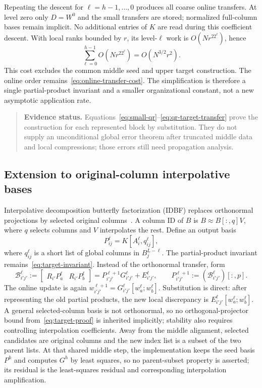 \documentclass[11pt,a4paper]{article}
\newenvironment{evidence}{\begin{quote}\small\color{muted}\textbf{Evidence status.} }{\end{quote}}
\begin{document}
Repeating the descent for $\ell=h-1,\ldots,0$ produces all coarse online transfers. At level zero only $D=W^0$ and the small transfers are stored; normalized full-column bases remain implicit. No additional entries of $K$ are read during this coefficient descent. With local ranks bounded by $r$, its level-$\ell$ work is $O(Nr^22^\ell)$, hence
\begin{equation}
 \sum_{\ell=0}^{h-1}O(Nr^22^\ell)=O(N^{3/2}r^2).
 \label{eq:qr-descent-cost}
\end{equation}
This cost excludes the common middle seed and upper target construction. The online order remains~\eqref{eq:online-transfer-cost}. The simplification is therefore a single partial-product invariant and a smaller organizational constant, not a new asymptotic application rate.
\begin{evidence}
Equations~\eqref{eq:small-qr}--\eqref{eq:qr-target-transfer} prove the construction for each represented block by substitution. They do not supply an unconditional global error theorem after truncated middle data and local compressions; those errors still need propagation analysis.
\end{evidence}

\subsection{Extension to original-column interpolative bases}
\label{sec:idbf-target}
Interpolative decomposition butterfly factorization (IDBF) replaces orthonormal projections by selected original columns~\cite{pang2018idbf}. A column ID of $B$ is $B\approx B[:,q]V$, where $q$ selects columns and $V$ interpolates the rest. Define an output basis
\begin{equation}
 P_{ij}^{\ell}=K[A_i^\ell,q_{ij}^{\ell}],
 \label{eq:id-original-basis}
\end{equation}
where $q_{ij}^{\ell}$ is a short list of global columns in $B_j^{L-\ell}$. The partial-product invariant remains~\eqref{eq:target-invariant}. Instead of the orthonormal transfer, form
\begin{equation}
 \mathcal B_{i'j'}^{\ell}:=
 \begin{bmatrix}R_{i'}P_a^\ell&R_{i'}P_b^\ell\end{bmatrix}
 =P_{i'j'}^{\ell+1}G_{i'j'}^\ell+E_{i'j'}^\ell,
 \qquad
 P_{i'j'}^{\ell+1}:=(\mathcal B_{i'j'}^\ell)[:,p].
 \label{eq:id-target-transfer}
\end{equation}
The online update is again $w_{i'j'}^{\ell+1}=G_{i'j'}^\ell[w_a^\ell;w_b^\ell]$. Substitution is direct: after representing the old partial products, the new local discrepancy is $E_{i'j'}^\ell[w_a^\ell;w_b^\ell]$. A general selected-column basis is not orthonormal, so no orthogonal-projector bound from~\eqref{eq:target-proof} is inherited implicitly; stability also requires controlling interpolation coefficients. Away from the middle alignment, selected candidates are original columns and the new index list is a subset of the two parent lists. At that shared middle step, the implementation keeps the seed basis $P^h$ and computes $G^h$ by least squares, so no parent-subset property is asserted; its residual is the least-squares residual and corresponding interpolation amplification.
\end{document}
